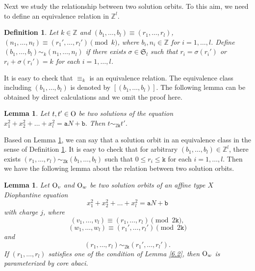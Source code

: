 \documentclass[11pt]{amsart}
\theoremstyle{plain}
\numberwithin{equation}{subsection}
\newtheorem{lemma}[theorem]{Lemma}
\newtheorem{definition}[theorem]{Definition}
\begin{document}
Next we study the relationship between two solution orbits. To this aim, we need to define an equivalence relation in $\mathbb{Z}^l$.

\begin{definition}\label{6.3}
Let $k\in \mathbb{Z}$ and $(b_1, \dots, b_l)\equiv (r_1, \dots, r_l)$, $(n_1, \dots, n_l)\equiv (r_1', \dots, r_l') \pmod k$, 
where $b_i, n_i\in \mathbb{Z}$ for $i=1, \dots, l$. Define $(b_1, \dots, b_l) \sim_k (n_1, \dots, n_l)$ if there exists 
$\sigma\in \mathfrak{S}_l$ such that $r_i=\sigma(r_i')$ or $r_i+\sigma(r_i')=k$ for each $i=1, \dots, l$.
\end{definition}

It is easy to check that $\equiv_k$ is an equivalence relation. 
The equivalence class including $(b_1, \dots, b_l)$ is denoted by $[(b_1, \dots, b_l)]$.
The following lemma can be obtained by direct calculations and we omit the proof here.

\begin{lemma}\label{5.4'}
Let $t, t'\in \rm O$ be two solutions of the equation $x_1^2+x_2^2+\dots+x_l^2=\mathtt{a}N+\mathtt{b}.$ 
Then $t \sim_{2\mathtt{k}} t'$.
\end{lemma}

Based on Lemma \ref{5.4'}, we can say that a solution orbit in an equivalence class in the sense of Definition \ref{6.3}.
It is easy to check that for arbitrary $(b_1, \dots, b_l)\in \mathbb{Z}^l$, there exists $(r_1, \dots, r_l)\sim_{2\mathtt{k}}(b_1, \dots, b_l)$ 
such that $0\leq r_i\leq \mathtt{k}$ for each $i=1, \dots, l$.
Then we have the following lemma about the relation between two solution orbits.

\begin{lemma}\label{6.4}
Let ${\rm O}_v$ and ${\rm O}_w$ be two solution orbits of an affine type $X$ Diophantine equation $$x_1^2+x_2^2+\dots+x_l^2=\mathtt{a}N+\mathtt{b}$$
with charge $j$, where $$(v_1, \dots, v_l)\equiv (r_1, \dots, r_l) \pmod {2\mathtt{k}},
$$ $$(w_1, \dots, w_l)\equiv (r_1', \dots, r_l') \pmod {2\mathtt{k}}$$ and
$$(r_1, \dots, r_l)\sim_{2\mathtt{k}}(r_1', \dots, r_l').$$
If $(r_1, \dots, r_l)$ satisfies one of the condition of Lemma \ref{6.2}, 
then ${\rm O}_w$ is parameterized by core abaci.
\end{lemma}
\end{document}
